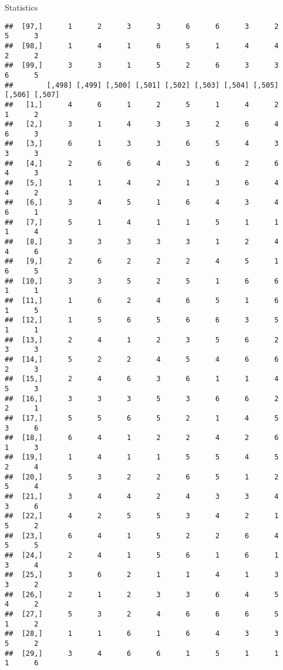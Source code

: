 \documentclass[
  ignorenonframetext,
]{beamer}
\begin{document}
\begin{frame}[fragile]{Statistics}
\begin{verbatim}
##  [97,]      1      2      3      3      6      6      3      2      5      3
##  [98,]      1      4      1      6      5      1      4      4      2      2
##  [99,]      3      3      1      5      2      6      3      3      6      5
##        [,498] [,499] [,500] [,501] [,502] [,503] [,504] [,505] [,506] [,507]
##   [1,]      4      6      1      2      5      1      4      2      1      2
##   [2,]      3      1      4      3      3      2      6      4      6      3
##   [3,]      6      1      3      3      6      5      4      3      3      3
##   [4,]      2      6      6      4      3      6      2      6      4      3
##   [5,]      1      1      4      2      1      3      6      4      4      2
##   [6,]      3      4      5      1      6      4      3      4      6      1
##   [7,]      5      1      4      1      1      5      1      1      1      4
##   [8,]      3      3      3      3      3      1      2      4      4      6
##   [9,]      2      6      2      2      2      4      5      1      6      5
##  [10,]      3      3      5      2      5      1      6      6      1      1
##  [11,]      1      6      2      4      6      5      1      6      1      5
##  [12,]      1      5      6      5      6      6      3      5      1      1
##  [13,]      2      4      1      2      3      5      6      2      3      3
##  [14,]      5      2      2      4      5      4      6      6      2      3
##  [15,]      2      4      6      3      6      1      1      4      5      3
##  [16,]      3      3      3      5      3      6      6      2      2      1
##  [17,]      5      5      6      5      2      1      4      5      3      6
##  [18,]      6      4      1      2      2      4      2      6      1      3
##  [19,]      1      4      1      1      5      5      4      5      2      4
##  [20,]      5      3      2      2      6      5      1      2      5      4
##  [21,]      3      4      4      2      4      3      3      4      3      6
##  [22,]      4      2      5      5      3      4      2      1      5      2
##  [23,]      6      4      1      5      2      2      6      4      5      5
##  [24,]      2      4      1      5      6      1      6      1      3      4
##  [25,]      3      6      2      1      1      4      1      3      3      2
##  [26,]      2      1      2      3      3      6      4      5      4      2
##  [27,]      5      3      2      4      6      6      6      5      1      2
##  [28,]      1      1      6      1      6      4      3      3      5      2
##  [29,]      3      4      6      6      1      5      1      1      1      6

\end{verbatim}
\end{frame}
\end{document}
